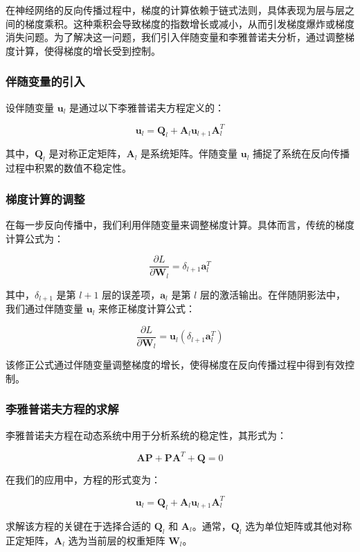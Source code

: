 \documentclass[12pt,a4paper]{amsart}
\begin{document}
在神经网络的反向传播过程中，梯度的计算依赖于链式法则，具体表现为层与层之间的梯度乘积。这种乘积会导致梯度的指数增长或减小，从而引发梯度爆炸或梯度消失问题。为了解决这一问题，我们引入伴随变量和李雅普诺夫分析，通过调整梯度计算，使得梯度的增长受到控制。

\subsubsection{伴随变量的引入}

设伴随变量 \( \mathbf{u}_l \) 是通过以下李雅普诺夫方程定义的：

\[ \mathbf{u}_l = \mathbf{Q}_l + \mathbf{A}_l \mathbf{u}_{l+1} \mathbf{A}_l^T \]

其中，\( \mathbf{Q}_l \) 是对称正定矩阵，\( \mathbf{A}_l \) 是系统矩阵。伴随变量 \( \mathbf{u}_l \) 捕捉了系统在反向传播过程中积累的数值不稳定性。

\subsubsection{梯度计算的调整}

在每一步反向传播中，我们利用伴随变量来调整梯度计算。具体而言，传统的梯度计算公式为：

\[ \frac{\partial L}{\partial \mathbf{W}_l} = \delta_{l+1} \mathbf{a}_l^T \]

其中，\( \delta_{l+1} \) 是第 \( l+1 \) 层的误差项，\( \mathbf{a}_l \) 是第 \( l \) 层的激活输出。在伴随阴影法中，我们通过伴随变量 \( \mathbf{u}_l \) 来修正梯度计算公式：

\[ \frac{\partial L}{\partial \mathbf{W}_l} = \mathbf{u}_l (\delta_{l+1} \mathbf{a}_l^T) \]

该修正公式通过伴随变量调整梯度的增长，使得梯度在反向传播过程中得到有效控制。

\subsubsection{李雅普诺夫方程的求解}

李雅普诺夫方程在动态系统中用于分析系统的稳定性，其形式为：

\[ \mathbf{A} \mathbf{P} + \mathbf{P} \mathbf{A}^T + \mathbf{Q} = 0 \]

在我们的应用中，方程的形式变为：

\[ \mathbf{u}_l = \mathbf{Q}_l + \mathbf{A}_l \mathbf{u}_{l+1} \mathbf{A}_l^T \]

求解该方程的关键在于选择合适的 \( \mathbf{Q}_l \) 和 \( \mathbf{A}_l \)。通常，\( \mathbf{Q}_l \) 选为单位矩阵或其他对称正定矩阵，\( \mathbf{A}_l \) 选为当前层的权重矩阵 \( \mathbf{W}_l \)。
\end{document}
